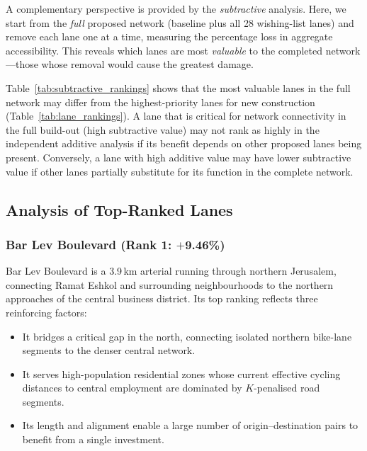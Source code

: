 \documentclass[12pt,a4paper]{article}
\begin{document}
A complementary perspective is provided by the \emph{subtractive} analysis. Here, we start from the \emph{full} proposed network (baseline plus all 28 wishing-list lanes) and remove each lane one at a time, measuring the percentage loss in aggregate accessibility. This reveals which lanes are most \emph{valuable} to the completed network---those whose removal would cause the greatest damage.



Table~\ref{tab:subtractive_rankings} shows that the most valuable lanes in the full network may differ from the highest-priority lanes for new construction (Table~\ref{tab:lane_rankings}). A lane that is critical for network connectivity in the full build-out (high subtractive value) may not rank as highly in the independent additive analysis if its benefit depends on other proposed lanes being present. Conversely, a lane with high additive value may have lower subtractive value if other lanes partially substitute for its function in the complete network.

\subsection{Analysis of Top-Ranked Lanes}

\subsubsection{Bar Lev Boulevard (Rank 1: $+$9.46\%)}

Bar Lev Boulevard is a 3.9\,km arterial running through northern Jerusalem, connecting Ramat Eshkol and surrounding neighbourhoods to the northern approaches of the central business district. Its top ranking reflects three reinforcing factors:

\begin{itemize}[leftmargin=*,nosep]
    \item It bridges a critical gap in the north, connecting isolated northern bike-lane segments to the denser central network.
    \item It serves high-population residential zones whose current effective cycling distances to central employment are dominated by $K$-penalised road segments.
    \item Its length and alignment enable a large number of origin--destination pairs to benefit from a single investment.
\end{itemize}
\end{document}
